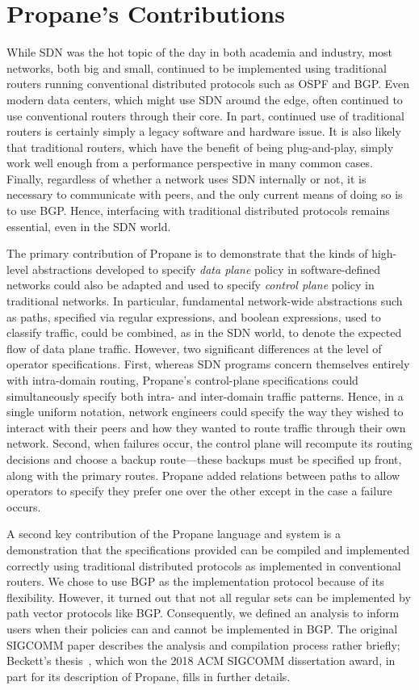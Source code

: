 \documentclass[10pt]{sigalternate052015}
\begin{document}
\section{Propane's Contributions}

While SDN was the hot topic of the day in both academia and industry,
most networks, both big and small, continued to be implemented using
traditional routers running conventional distributed protocols such as
OSPF and BGP.  Even modern data centers, which might use SDN around
the edge, often continued to use conventional routers through their
core.  In part, continued use of traditional routers is certainly
simply a legacy software and hardware issue.  It is also likely that
traditional routers, which have the benefit of being plug-and-play,
simply work well enough from a performance perspective in many common
cases.  Finally, regardless of whether a network uses SDN internally
or not, it is necessary to communicate with peers, and the only
current means of doing so is to use BGP.  Hence, interfacing with
traditional distributed protocols remains essential, even in the SDN
world.

The primary contribution of Propane is to demonstrate that the kinds
of high-level abstractions developed to specify \emph{data plane} policy in
software-defined networks could also be adapted and used to specify
\emph{control plane} policy in traditional networks. In particular,
fundamental network-wide abstractions such as paths, specified via
regular expressions, and boolean expressions, used to
classify traffic, could be combined, as in the SDN world, to denote
the expected flow of data plane traffic.  However, two significant
differences at the level of operator specifications.  First, whereas SDN
programs concern themselves entirely with intra-domain routing,
Propane's control-plane specifications could simultaneously specify
both intra- and inter-domain traffic patterns.  Hence, in a single
uniform
notation, network engineers could specify the way they wished to
interact with their peers and how they wanted to route traffic through
their own network.  Second, when failures
occur, the control plane will recompute its routing decisions and
choose a backup route---these backups must be specified up front,
along with the primary routes.  Propane added relations between paths
to allow operators to specify they prefer one over the other except in
the case a failure occurs.

A second key contribution of the Propane language and system is a
demonstration that the specifications provided can be compiled
and implemented correctly using traditional distributed protocols
as implemented in conventional routers.  We chose to use BGP as the
implementation protocol because of its flexibility.  However, it turned out
that not all regular sets can be implemented by path vector protocols
like BGP.  Consequently, we defined an analysis to inform users when
their policies can and cannot be implemented in BGP.  The original
SIGCOMM paper describes the analysis and compilation process rather briefly;
Beckett's thesis~\cite{beckett:thesis}, which won the 2018 ACM SIGCOMM
dissertation award, in part for its description of Propane, fills in further details.
\end{document}
